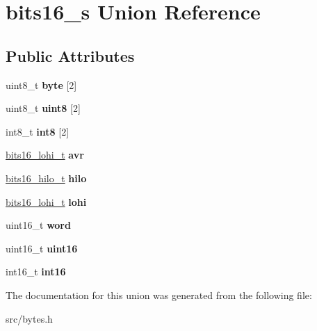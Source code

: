 \hypertarget{unionbits16__s}{}\section{bits16\+\_\+s Union Reference}
\label{unionbits16__s}
\subsection*{Public Attributes}
\begin{DoxyCompactItemize}
\item 
\hypertarget{unionbits16__s_a8e70ab734bd08c67b789e0ffb1d67892}{}\label{unionbits16__s_a8e70ab734bd08c67b789e0ffb1d67892} 
uint8\+\_\+t {\bfseries byte} \mbox{[}2\mbox{]}
\item 
\hypertarget{unionbits16__s_aa05d8486a82ce525c07f162c2a5d1534}{}\label{unionbits16__s_aa05d8486a82ce525c07f162c2a5d1534} 
uint8\+\_\+t {\bfseries uint8} \mbox{[}2\mbox{]}
\item 
\hypertarget{unionbits16__s_a8f4ee6dd238c821c99a5766ef0bae0e4}{}\label{unionbits16__s_a8f4ee6dd238c821c99a5766ef0bae0e4} 
int8\+\_\+t {\bfseries int8} \mbox{[}2\mbox{]}
\item 
\hypertarget{unionbits16__s_af0ebecfcbdd064f43b10f70e49b133bd}{}\label{unionbits16__s_af0ebecfcbdd064f43b10f70e49b133bd} 
\hyperlink{structbits16__lohi__s}{bits16\+\_\+lohi\+\_\+t} {\bfseries avr}
\item 
\hypertarget{unionbits16__s_a9a297f75a8f79930db07a7a458f3a4c4}{}\label{unionbits16__s_a9a297f75a8f79930db07a7a458f3a4c4} 
\hyperlink{structbits16__hilo__s}{bits16\+\_\+hilo\+\_\+t} {\bfseries hilo}
\item 
\hypertarget{unionbits16__s_abf1a2610c051d39886f4e1ea67b20502}{}\label{unionbits16__s_abf1a2610c051d39886f4e1ea67b20502} 
\hyperlink{structbits16__lohi__s}{bits16\+\_\+lohi\+\_\+t} {\bfseries lohi}
\item 
\hypertarget{unionbits16__s_affde397ef273ced95c39dcdad4b27c98}{}\label{unionbits16__s_affde397ef273ced95c39dcdad4b27c98} 
uint16\+\_\+t {\bfseries word}
\item 
\hypertarget{unionbits16__s_abf83c4c027232cd129c9c9d4f8dd0ce6}{}\label{unionbits16__s_abf83c4c027232cd129c9c9d4f8dd0ce6} 
uint16\+\_\+t {\bfseries uint16}
\item 
\hypertarget{unionbits16__s_a8be8d70895f37f5e17c483a12b98363b}{}\label{unionbits16__s_a8be8d70895f37f5e17c483a12b98363b} 
int16\+\_\+t {\bfseries int16}
\end{DoxyCompactItemize}


The documentation for this union was generated from the following file\+:\begin{DoxyCompactItemize}
\item 
src/bytes.\+h\end{DoxyCompactItemize}

